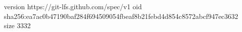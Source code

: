 version https://git-lfs.github.com/spec/v1
oid sha256:ea7ac0b47190baf284f694509054fbeaf8b21febd4d854c8572abcf947ec3632
size 3332
